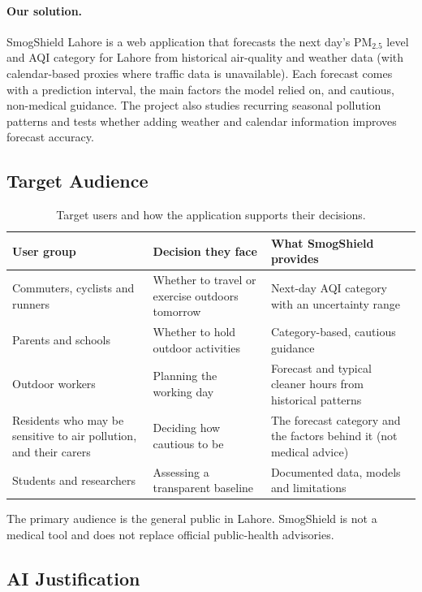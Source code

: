 \paragraph{Our solution.} SmogShield Lahore is a web application that forecasts the next day's PM$_{2.5}$ level and AQI category for Lahore from historical air-quality and weather data (with calendar-based proxies where traffic data is unavailable). Each forecast comes with a prediction interval, the main factors the model relied on, and cautious, non-medical guidance. The project also studies recurring seasonal pollution patterns and tests whether adding weather and calendar information improves forecast accuracy.

\subsection{Target Audience}

\begin{table}[h]
\centering
\small
\begin{tabular}{L{3.6cm}L{4.6cm}L{5.6cm}}
\toprule
\textbf{User group} & \textbf{Decision they face} & \textbf{What SmogShield provides} \\
\midrule
Commuters, cyclists and runners & Whether to travel or exercise outdoors tomorrow & Next-day AQI category with an uncertainty range \\
Parents and schools & Whether to hold outdoor activities & Category-based, cautious guidance \\
Outdoor workers & Planning the working day & Forecast and typical cleaner hours from historical patterns \\
Residents who may be sensitive to air pollution, and their carers & Deciding how cautious to be & The forecast category and the factors behind it (not medical advice) \\
Students and researchers & Assessing a transparent baseline & Documented data, models and limitations \\
\bottomrule
\end{tabular}
\caption{Target users and how the application supports their decisions.}
\end{table}

The primary audience is the general public in Lahore. SmogShield is not a medical tool and does not replace official public-health advisories.

\subsection{AI Justification}

